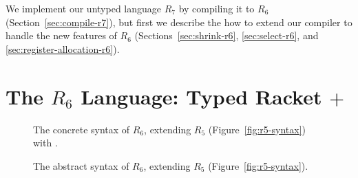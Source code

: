 \documentclass[11pt]{book}
\newcommand{\gray}[1]{{\color{gray} #1}}
\begin{document}
We implement our untyped language $R_7$ by compiling it to $R_6$
(Section~\ref{sec:compile-r7}), but first we describe the how to
extend our compiler to handle the new features of $R_6$
(Sections~\ref{sec:shrink-r6}, \ref{sec:select-r6}, and
\ref{sec:register-allocation-r6}).

\section{The $R_6$ Language: Typed Racket $+$ }
\label{sec:r6-lang}

\begin{figure}[tp]
\centering
\fbox{
\begin{minipage}{0.97\textwidth}\small
\[
\begin{array}{lcl}
  \Type &::=& \gray{\key{Integer} \mid \key{Boolean}
     \mid \LP\key{Vector}\;\Type\ldots\RP \mid \LP\key{Vectorof}\;\Type\RP \mid \key{Void}} \\
    &\mid& \gray{\LP\Type\ldots \; \key{->}\; \Type\RP} \mid \key{Any} \\
  \FType &::=& \key{Integer} \mid \key{Boolean} \mid \key{Void} \mid \LP\key{Vectorof}\;\key{Any}\RP \mid \LP\key{Vector}\; \key{Any}\ldots\RP \\
    &\mid& \LP\key{Any}\ldots \; \key{->}\; \key{Any}\RP\\
  \Exp &::=& \ldots 
   \mid \CINJECT{\Exp}{\FType}\RP \mid \CPROJECT{\Exp}{\FType} \\
  & \mid & \LP\key{boolean?}\;\Exp\RP \mid \LP\key{integer?}\;\Exp\RP\\
  & \mid & \LP\key{vector?}\;\Exp\RP \mid \LP\key{procedure?}\;\Exp\RP \mid \LP\key{void?}\;\Exp\RP \\
  \Def &::=& \gray{ \CDEF{\Var}{\LS\Var \key{:} \Type\RS\ldots}{\Type}{\Exp} } \\
  R_6 &::=& \gray{\Def\ldots \; \Exp}
\end{array}
\]
\end{minipage}
}
\caption{The concrete syntax of $R_6$, extending $R_5$ (Figure~\ref{fig:r5-syntax})
  with .}
\label{fig:r6-concrete-syntax}
\end{figure}

\begin{figure}[tp]
\centering
\fbox{
  \begin{minipage}{0.96\textwidth}
    \small
\[
\begin{array}{lcl}
  \itm{op} &::= & \code{boolean?} \mid \code{integer?} \mid \code{vector?}
    \mid \code{procedure?} \mid \code{void?} \\
  \Exp &::=& \ldots
   \mid \INJECT{\Exp}{\FType} \mid \PROJECT{\Exp}{\FType} \\
 \Def &::=& \gray{ \FUNDEF{\Var}{\LP[\Var \code{:} \Type]\ldots\RP}{\Type}{\code{'()}}{\Exp} }\\
  R_5 &::=& \gray{ \PROGRAMDEFSEXP{\code{'()}}{\LP\Def\ldots\RP}{\Exp} }
\end{array}
\]
\end{minipage}
}
\caption{The abstract syntax of $R_6$, extending $R_5$ (Figure~\ref{fig:r5-syntax}).}
\label{fig:r6-syntax}
\end{figure}
\end{document}
